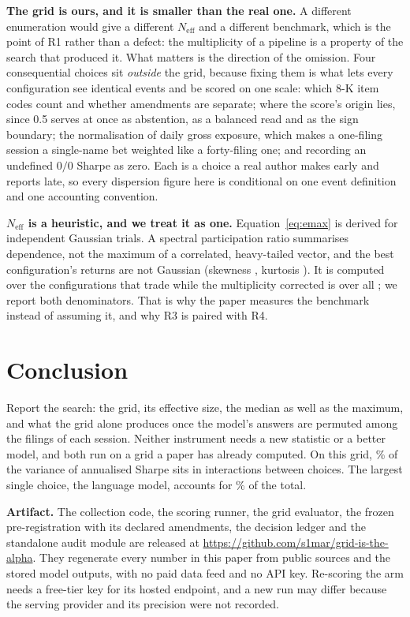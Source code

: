 \documentclass[sigconf]{acmart}
\newcommand{\ArtifactURL}{\url{https://github.com/s1mar/grid-is-the-alpha}}
\begin{document}
\textbf{The grid is ours, and it is smaller than the real one.} A different enumeration would give a
different $N_{\mathrm{eff}}$ and a different benchmark, which is the point of R1 rather than a
defect: the multiplicity of a pipeline is a property of the search that produced it. What matters is
the direction of the omission. Four consequential choices sit \emph{outside} the grid, because
fixing them is what lets every configuration see identical events and be scored on one scale: which 8-K item codes count and
whether amendments are separate; where the score's origin lies, since 0.5 serves at once as
abstention, as a balanced read and as the sign boundary; the normalisation of daily gross exposure,
which makes a one-filing session a single-name bet weighted like a forty-filing one; and recording
an undefined $0/0$ Sharpe as zero. Each is a choice a real author makes early and reports late, so
every dispersion figure here is conditional on one event definition and one accounting convention.

\textbf{$N_{\mathrm{eff}}$ is a heuristic, and we treat it as one.} Equation~\eqref{eq:emax} is
derived for independent Gaussian trials. A spectral participation ratio summarises dependence, not
the maximum of a correlated, heavy-tailed vector, and the best configuration's returns are not
Gaussian (skewness \BestSkew{}, kurtosis \BestKurt{}). It is computed over the \NumLiveConfigs{}
configurations that trade while the multiplicity corrected is over all \NumConfigs{}; we report both
denominators. That is why the paper measures the benchmark instead of assuming it, and why R3 is
paired with R4.

\section{Conclusion}

Report the search: the grid, its effective size, the median as well as the maximum, and what the
grid alone produces once the model's answers are permuted among the filings of each session. Neither
instrument needs a new statistic or a
better model, and both run on a grid a paper has already computed. On this grid,
\VarShareInteractions{}\% of the variance of annualised Sharpe sits in interactions between choices.
The largest single choice, the language model, accounts for \VarShareModel{}\% of the total.

\medskip\noindent\textbf{Artifact.} The collection code, the scoring runner, the grid evaluator, the
frozen pre-registration with its declared \NumAmendments{} amendments, the decision ledger and the
standalone audit module are released at \ArtifactURL{}. They regenerate every number in this paper
from public sources and the stored model outputs, with no paid data feed and no API key.
Re-scoring the \BigParams{} arm needs a free-tier key for its hosted endpoint, and a new run may
differ because the serving provider and its precision were not recorded.
\end{document}
